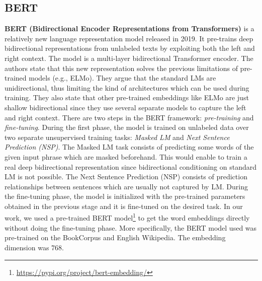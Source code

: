 \documentclass[11pt,a4paper]{article}
\begin{document}
\subsection{BERT}

\textbf{BERT (Bidirectional Encoder Representations from Transformers)} \cite{devlin2018bert} is a relatively new language representation model released in 2019. It pre-trains deep bidirectional representations from unlabeled texts by exploiting both the left and right context. The model is a multi-layer bidirectional Transformer encoder. The authors state that this new representation solves the previous limitations of pre-trained models (e.g., ELMo). They argue that the standard LMs are unidirectional, thus limiting the kind of architectures which can be used during training. They also state that other pre-trained embeddings like ELMo are just shallow bidirectional since they use several separate models to capture the left and right context.
There are two steps in the BERT framework: \textit{pre-training} and \textit{fine-tuning}. During the first phase, the model is trained on unlabeled data over two separate unsupervised training tasks: \textit{Masked LM} and \textit{Next Sentence Prediction (NSP)}.  The Masked LM task consists of predicting some words of the given input phrase which are masked beforehand.  This would enable to train a real deep bidirectional representation since bidirectional conditioning on standard LM is not possible. The Next Sentence Prediction (NSP) consists of prediction relationships between sentences which are usually not captured by LM. 
During the fine-tuning phase, the model is initialized with the pre-trained parameters obtained in the previous stage and it is fine-tuned on the desired task. 
In our work, we used a pre-trained BERT model\footnote{\url{https://pypi.org/project/bert-embedding/}} to get the word embeddings directly without doing the fine-tuning phase. More specifically, the BERT model used was pre-trained on the BookCorpus \cite{moviebook} and English Wikipedia. The embedding dimension was 768.  
\end{document}
